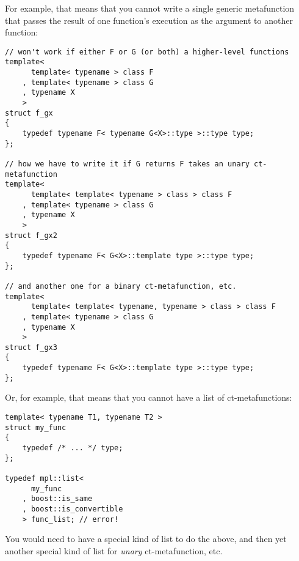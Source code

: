 \documentclass{netobjectdays}
\begin{document}

For example, that means that you cannot write a single 
generic metafunction that passes the result of one 
function's execution as the argument to another function:


{\footnotesize
\begin{verbatim}
// won't work if either F or G (or both) a higher-level functions
template<
      template< typename > class F
    , template< typename > class G
    , typename X
    >
struct f_gx
{
    typedef typename F< typename G<X>::type >::type type;
};

// how we have to write it if G returns F takes an unary ct-metafunction
template<
      template< template< typename > class > class F
    , template< typename > class G
    , typename X
    >
struct f_gx2
{
    typedef typename F< G<X>::template type >::type type;
};

// and another one for a binary ct-metafunction, etc.
template<
      template< template< typename, typename > class > class F
    , template< typename > class G
    , typename X
    >
struct f_gx3
{
    typedef typename F< G<X>::template type >::type type;
};
\end{verbatim}
}

Or, for example, that means that you cannot have a list of 
ct-metafunctions:

{\footnotesize
\begin{verbatim}
template< typename T1, typename T2 >
struct my_func
{
    typedef /* ... */ type;
};

typedef mpl::list< 
      my_func
    , boost::is_same
    , boost::is_convertible
    > func_list; // error!
\end{verbatim}
}

You would need to have a special kind of list to do the above, 
and then yet another special kind of list for \emph{unary} 
ct-metafunction, etc.
\end{document}
